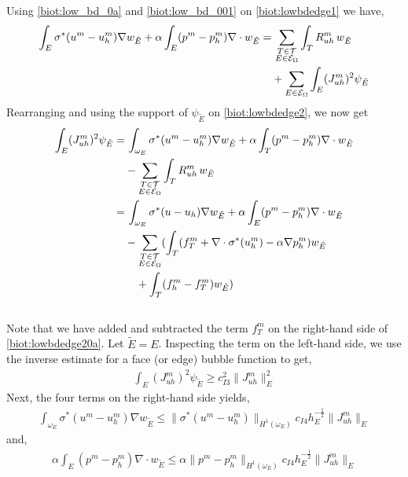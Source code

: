 Using \eqref{biot:low_bd_0a} and \eqref{biot:low_bd_001} on \eqref{biot:lowbdedge1} we have,
\begin{align}\label{biot:lowbdedge2}
\int_E \sigma^{\ast}(u^m-u^m_h) \nabla w_{\tilde{E}} + \alpha \int_E (p^m-p_h^m) \nabla \cdot w_{\tilde{E}} = & \, \sum_{\substack{T \in \mathcal{T} \\ E \in \mathcal{E}_\Omega}} \int_T R^m_{uh}\, w_{\tilde{E}}  \\
& + \sum_{E \in \mathcal{E}_\Omega} \int_E (J^m_{uh})^2 \psi_{\tilde{E}} \notag
\end{align}
Rearranging and using the support of $\psi_{\tilde{E}}$ on \eqref{biot:lowbdedge2}, we now get
\begin{align}\label{biot:lowbdedge20a}
\int_E (J^m_{uh})^2 \psi_{\tilde{E}} = & \, \int_{\omega_E} \sigma^{\ast}(u^m-u^m_h) \nabla w_{\tilde{E}} + \alpha \int_T (p^m-p_h^m) \nabla \cdot w_{\tilde{E}} \\
& - \sum_{\substack{T \in \mathcal{T} \\ E \in \mathcal{E}_\Omega}} \int_T R^m_{uh}\, w_{\tilde{E}} \notag \\
= & \, \int_{\omega_E} \sigma^{\ast}(u-u_h) \nabla w_{\tilde{E}} + \alpha \int_E (p^m-p_h^m) \nabla \cdot w_{\tilde{E}} \notag \\
& - \sum_{\substack{T \in \mathcal{T} \\ E \in \mathcal{E}_\Omega}}( \int_T (f^m_T + \nabla \cdot \sigma^{\ast}(u^m_h) - \alpha \nabla p^m_h) w_{\tilde{E}} \notag \\
& \quad + \int_T (f^m_h -f^m_T)w_{\tilde{E}}) \notag
\end{align}
\\
Note that we have added and subtracted the term $f_T^m$ on the right-hand side of \eqref{biot:lowbdedge20a}. Let $\tilde{E} = E$. Inspecting the term on the left-hand side, we use the inverse estimate for a face (or edge) bubble function to get,
\begin{align}
\int_E (J^m_{uh})^2 \psi_{\tilde{E}} \geq c_{I3}^2 \| J^m_{uh}\|_E^2
\end{align}
Next, the four terms on the right-hand side yields,
\begin{align}  \label{biot:lowbdedge03a}
\int_{\omega_E} \sigma^{\ast}(u^m-u^m_h) \nabla w_{\tilde{E}} \leq  \| \sigma^{\ast}(u^m-u^m_h) \|_{H^1(\omega_E)} c_{I4}h_E^{-\frac{1}{2}} \|J^m_{uh}\|_E 
\end{align}
and, 
\begin{align}  \label{biot:lowbdedge03b}
\alpha \int_E (p^m-p_h^m) \nabla \cdot w_{\tilde{E}} \leq \alpha \| p^m-p_h^m \|_{H^1(\omega_E)} c_{I4}h_E^{-\frac{1}{2}} \|J^m_{uh}\|_E 
\end{align}
